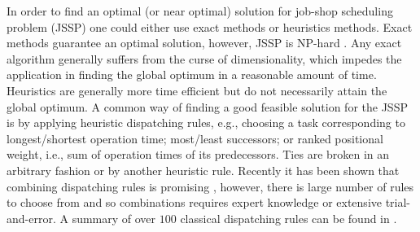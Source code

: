 \documentclass[10pt]{llncs}
\begin{document}
In order to find an optimal (or near optimal) solution for job-shop scheduling problem (JSSP) one could either use exact  methods or heuristics methods. Exact methods guarantee an optimal solution, however, JSSP is NP-hard \cite{Garey1976}. Any exact algorithm generally suffers from the curse of dimensionality, which impedes the application in finding the global optimum in a reasonable amount of time. Heuristics are generally more time efficient but do not necessarily attain the global optimum. A common way of finding a good feasible solution for the JSSP is by applying heuristic dispatching rules, e.g., choosing a task corresponding to longest/shortest operation time;  most/least successors; or ranked positional weight, i.e., sum of operation times of its predecessors. Ties are broken in an arbitrary fashion or by another heuristic rule. Recently it has been shown that combining dispatching rules is promising \cite{Tay2008}, however, there is large number of rules to choose from and so combinations requires expert knowledge or extensive trial-and-error. A summary of over $100$ classical dispatching rules can be found in \cite{Panwalkar1977a}. 

\end{document}

